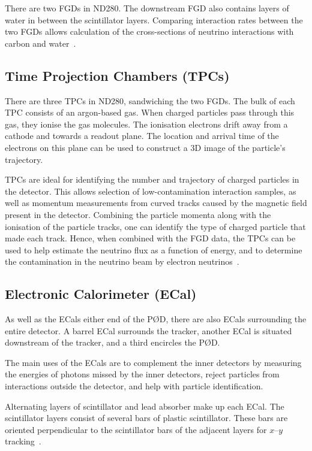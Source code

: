 \documentclass[aps,pra,12pt,notitlepage,tightenlines]{revtex4-1}
\begin{document}
There are two FGDs in ND280. The downstream FGD also contains layers of water in between the scintillator layers. Comparing interaction rates between the two FGDs allows calculation of the cross-sections of neutrino interactions with carbon and water~\cite{ABE2011106, Amaudruz:2012agx}.

\subsection{Time Projection Chambers (TPCs)}
There are three TPCs in ND280, sandwiching the two FGDs. The bulk of each TPC consists of an argon-based gas. When charged particles pass through this gas, they ionise the gas molecules. The ionisation electrons drift away from a cathode and towards a readout plane. The location and arrival time of the electrons on this plane can be used to construct a 3D image of the particle's trajectory.

TPCs are ideal for identifying the number and trajectory of charged particles in the detector. This allows selection of low-contamination interaction samples, as well as momentum measurements from curved tracks caused by the magnetic field present in the detector. Combining the particle momenta along with the ionisation of the particle tracks, one can identify the type of charged particle that made each track. Hence, when combined with the FGD data, the TPCs can be used to help estimate the neutrino flux as a function of energy, and to determine the contamination in the neutrino beam by electron neutrinos~\cite{ABE2011106, Abgrall:2010hi}.

\subsection{Electronic Calorimeter (ECal)}
As well as the ECals either end of the P\O D, there are also ECals surrounding the entire detector. A barrel ECal surrounds the tracker, another ECal is situated downstream of the tracker, and a third encircles the P\O D. %

The main uses of the ECals are to complement the inner detectors by measuring the energies of photons missed by the inner detectors, reject particles from interactions outside the detector, and help with particle identification.

Alternating layers of scintillator and lead absorber make up each ECal. The scintillator layers consist of several bars of plastic scintillator. These bars are oriented perpendicular to the scintillator bars of the adjacent layers for $x$--$y$ tracking~\cite{ABE2011106, Allan:2013ofa}.
\end{document}
